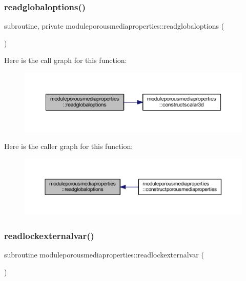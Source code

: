 \subsubsection{\texorpdfstring{readglobaloptions()}{readglobaloptions()}}
{\footnotesize\ttfamily subroutine, private moduleporousmediaproperties\+::readglobaloptions (\begin{DoxyParamCaption}{ }\end{DoxyParamCaption})\hspace{0.3cm}{\ttfamily [private]}}

Here is the call graph for this function\+:\nopagebreak
\begin{figure}[H]
\begin{center}
\leavevmode
\includegraphics[width=350pt]{namespacemoduleporousmediaproperties_a9215099aea454d7ad22a07e69b0b6065_cgraph}
\end{center}
\end{figure}
Here is the caller graph for this function\+:\nopagebreak
\begin{figure}[H]
\begin{center}
\leavevmode
\includegraphics[width=350pt]{namespacemoduleporousmediaproperties_a9215099aea454d7ad22a07e69b0b6065_icgraph}
\end{center}
\end{figure}
\mbox{\label{namespacemoduleporousmediaproperties_a56260cc89bfdab790c373015aa5f4675}} 
\subsubsection{\texorpdfstring{readlockexternalvar()}{readlockexternalvar()}}
{\footnotesize\ttfamily subroutine moduleporousmediaproperties\+::readlockexternalvar (\begin{DoxyParamCaption}{ }\end{DoxyParamCaption})\hspace{0.3cm}{\ttfamily [private]}}

